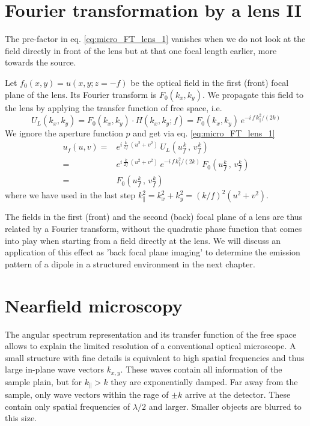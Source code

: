 \section{Fourier transformation by a lens II}


The pre-factor in eq.  \ref{eq:micro_FT_lens_1} vanishes when we do not look at the field directly in front of the lens but at that  one focal length earlier, more towards the source.


Let $f_0(x,y) = u(x,y; z = -f)$ be the optical field in the first (front) focal plane of the lens. Its Fourier transform is $F_0(k_x, k_y)$. We propagate this field to the lens by applying the transfer function of free space, i.e.
\begin{equation}
U_L(k_x, k_y) = F_0(k_x, k_y) \cdot H(k_x, k_y; f) = F_0(k_x, k_y) \, e^{-i \,  f \, k_\parallel^2 / (2 k)}
\end{equation}
We ignore the aperture function $p$ and get via eq. \ref{eq:micro_FT_lens_1} 
\begin{align}
    u_f(u,v)  = & e^{i \, \frac{k}{2f} \, ( u^2 + v^2) } \, U_{L} \left(u \frac{k}{f} \,  , \,  v \frac{k}{f} \right) \\
    = & e^{i \, \frac{k}{2f} \, ( u^2 + v^2) }   \, e^{-i \,  f \, k_\parallel^2 / (2 k)}
    \, F_{0} \left(u \frac{k}{f} \,  , \,  v \frac{k}{f} \right)  \\
    = &  F_{0} \left(u \frac{k}{f} \,  , \,  v \frac{k}{f} \right)  
\end{align}
where we have used in the last step $k_\parallel^2 = k_x^2 + k_y^2 = (k/f)^2 (u^2 + v^2)$. 

The fields in the first (front) and the second (back) focal plane of a lens are thus related by a Fourier transform, without the quadratic phase function that comes into play when starting from a field directly at the lens. We will discuss an application of this effect as 'back focal plane imaging' to determine the emission pattern of a dipole in a structured environment in the next chapter.




\section{Nearfield microscopy}


The angular spectrum representation and its transfer function of the free space allows to explain the limited resolution of a conventional optical microscope. A small structure with fine details is equivalent to high spatial frequencies and thus large in-plane wave vectors $k_{x,y}$. These waves contain all information of the sample plain, but for $k_\parallel > k$ they are exponentially damped. Far away from the sample, only wave vectors within the rage of $\pm k$ arrive at the detector. These contain only spatial frequencies of $\lambda/2$ and larger. Smaller objects are blurred to this size.

